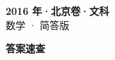 \documentclass[zihao=-4, a4paper]{ctexart}
\begin{document}
\begin{center}
  {\Large\bfseries 2016 年·北京卷·文科}\\[4pt]
  {\large 数学 · 简答版}
\end{center}
\medskip
{}

\clearpage
{}
\begin{center}{\Large\bfseries 答案速查}\end{center}
\medskip

\end{document}
